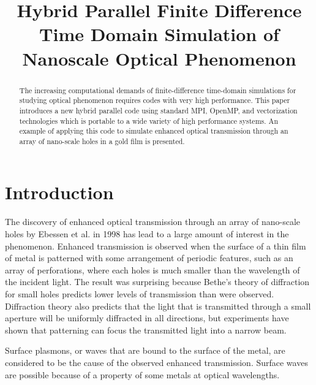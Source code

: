 \documentclass[11pt, conference, draftcls, letterpaper]{IEEEtran}
\begin{document}
\title{Hybrid Parallel Finite Difference Time Domain Simulation of
  Nanoscale Optical Phenomenon}
\author{ 
}

\maketitle

\begin{abstract}
  The increasing computational demands of finite-difference
  time-domain simulations for studying optical phenomenon requires
  codes with very high performance. This paper introduces a new hybrid
  parallel code using standard MPI, OpenMP, and vectorization
  technologies which is portable to a wide variety of high performance
  systems. An example of applying this code to simulate enhanced
  optical transmission through an array of nano-scale holes in a gold
  film is presented. 
\end{abstract}


\section{Introduction}
The discovery of enhanced optical transmission through an array of
nano-scale holes by Ebessen et al. \cite{ebessen1998} in 1998 has lead
to a large amount of interest in the phenomenon. Enhanced transmission
is observed when the surface of a thin film of metal is patterned with
some arrangement of periodic features, such as an array of
perforations, where each holes is much smaller than the wavelength of
the incident light. The result was surprising because Bethe's theory
of diffraction for small holes \cite{bethe1944} predicts lower levels
of transmission than were observed. Diffraction theory also predicts
that the light that is transmitted through a small aperture will be
uniformly diffracted in all directions, but experiments have shown
that patterning can focus the transmitted light into a narrow
beam. 

Surface plasmons, or waves that are bound to the surface of the metal,
are considered to be the cause of the observed enhanced
transmission. Surface waves are possible because of a property
of some metals at optical wavelengths. 
\end{document}
